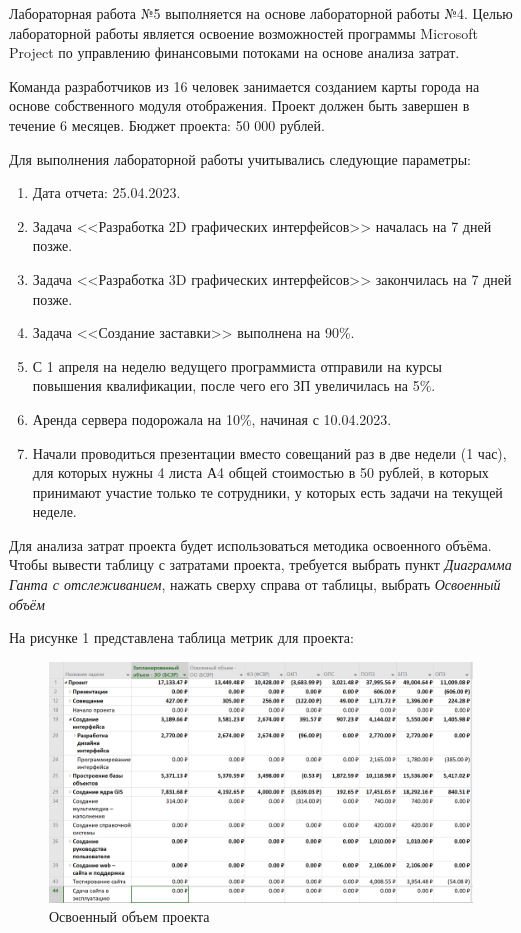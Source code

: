 Лабораторная работа №5 выполняется на основе лабораторной работы №4.
Целью лабораторной работы является освоение возможностей программы Microsoft Project по управлению финансовыми потоками на основе анализа затрат.

Команда разработчиков из 16 человек занимается созданием карты города на основе собственного модуля отображения. 
Проект должен быть завершен в течение 6 месяцев. Бюджет проекта: 50 000 рублей.

Для выполнения лабораторной работы учитывались следующие параметры:
\begin{enumerate}
	\item Дата отчета: 25.04.2023.
	\item Задача <<Разработка 2D графических интерфейсов>> началась на 7 дней позже.
	\item Задача <<Разработка 3D графических интерфейсов>> закончилась на 7 дней позже.
	\item Задача <<Создание заставки>> выполнена на 90\%.
	\item С 1 апреля на неделю ведущего программиста отправили на курсы повышения квалификации, после чего его ЗП увеличилась на 5\%.
	\item Аренда сервера подорожала на 10\%, начиная с 10.04.2023.
	\item Начали проводиться презентации вместо совещаний раз в две недели (1 час), для которых нужны 4 листа А4 общей стоимостью в 50 рублей, в которых принимают участие только те сотрудники, у которых есть задачи на текущей неделе.
\end{enumerate}

\newpage
{}
Для анализа затрат проекта будет использоваться методика освоенного объёма.
Чтобы вывести таблицу с затратами проекта, требуется выбрать пункт \textit{Диаграмма Ганта с отслеживанием}, нажать сверху справа от таблицы, выбрать \textit{Освоенный объём}

На рисунке 1 представлена таблица метрик для проекта:
\FloatBarrier
\begin{figure}[h]	
	\begin{center}
		\includegraphics[width=\linewidth]{inc/task1.png}
	\end{center}
	\captionsetup{justification=centering}
	\caption{Освоенный объем проекта}
\end{figure}
\FloatBarrier 

